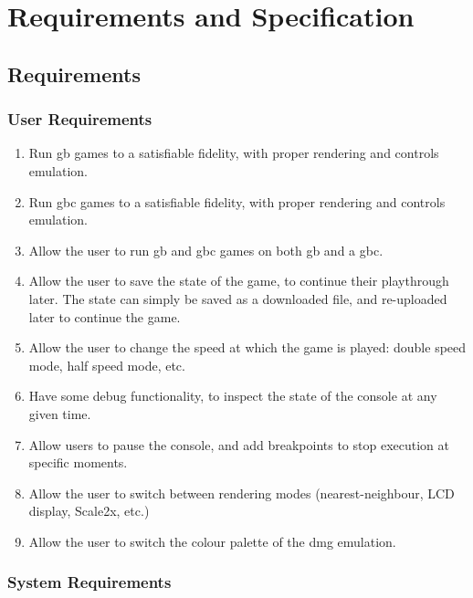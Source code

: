 \documentclass[11pt]{informatics-report}
\begin{document}
\chapter{Requirements and Specification}

\section{Requirements}

\subsection{User Requirements}

\begin{enumerate}[start=1,label=U\arabic*.]
    \item Run \glsdesc{gb} games to a satisfiable fidelity, with proper rendering and controls emulation.
    \item Run \glsdesc{gbc} games to a satisfiable fidelity, with proper rendering and controls emulation.
    \item Allow the user to run \gls{gb} and \gls{gbc} games on both  \glsdesc{gb} and a \glsdesc{gbc}.
    \item Allow the user to save the state of the game, to continue their playthrough later. The state can simply be saved as a downloaded file, and re-uploaded later to continue the game.
    \item Allow the user to change the speed at which the game is played: double speed mode, half speed mode, etc.
    \item Have some debug functionality, to inspect the state of the console at any given time.
    \item Allow users to pause the console, and add breakpoints to stop execution at specific moments.
    \item Allow the user to switch between rendering modes (nearest-neighbour, LCD display, Scale2x, etc.)
    \item Allow the user to switch the colour palette of the \gls{dmg} emulation.
\end{enumerate}

\subsection{System Requirements}
\end{document}
